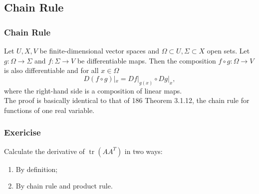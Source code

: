 \documentclass[12pt, t]{beamer}
\begin{document}
\subsection{Chain Rule}
\begin{frame}
    \frametitle{Chain Rule}
    Let $U,X,V$ be finite-dimensional vector spaces and $\Omega\subset U,\Sigma\subset X$ open sets. Let $g:\Omega\to\Sigma$ and $f:\Sigma\to V$ be differentiable maps. Then the composition $f\circ g:\Omega\to V$ is also differentiable and for all $x\in\Omega$
    \begin{equation}\label{2.2.4}
        D(f\circ g)|_x=Df|_{g(x)}\circ Dg|_x,
    \end{equation}
    where the right-hand side is a composition of linear maps.\\[5pt]
    The proof is basically identical to that of 186 Theorem 3.1.12, the chain
    rule for functions of one real variable. \\
\end{frame}

\begin{frame}
    \frametitle{Exericise}
    Calculate the derivative of $\operatorname{tr} (AA^T)$ in two ways:
    \begin{enumerate}
        \item By definition;
        \item By chain rule and product rule.
    \end{enumerate}

\end{frame}
\end{document}
